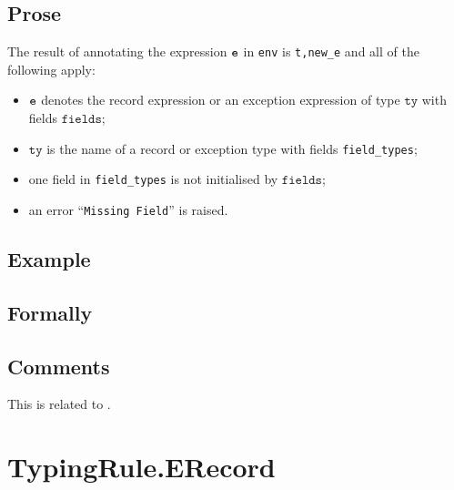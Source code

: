 \documentclass{book}
\newcommand\tty[0]{\texttt{ty}}
\newcommand\fields[0]{\texttt{fields}}
\begin{document}
\begin{itemize}
  \subsection{Prose}
  The result of annotating the expression $\texttt{e}$ in \texttt{env} is
\texttt{t,new\_e} and all of the following apply:
  \begin{itemize}
  \item $\texttt{e}$ denotes the record expression or an exception expression of type $\tty$ with fields $\fields$;
  \item $\tty$ is the name of a record or exception type with fields \texttt{field\_types};
  \item one field in \texttt{field\_types} is not initialised by $\fields$;
  \item an error ``\texttt{Missing Field}'' is raised.
  \end{itemize}

  \subsection{Example}



\begin{emptyformal}
    \subsection{Formally}

\end{emptyformal}

\subsection{Comments}
  This is related to .

\section{TypingRule.ERecord \label{sec:TypingRule.ERecord}}


\end{itemize}
\end{document}
